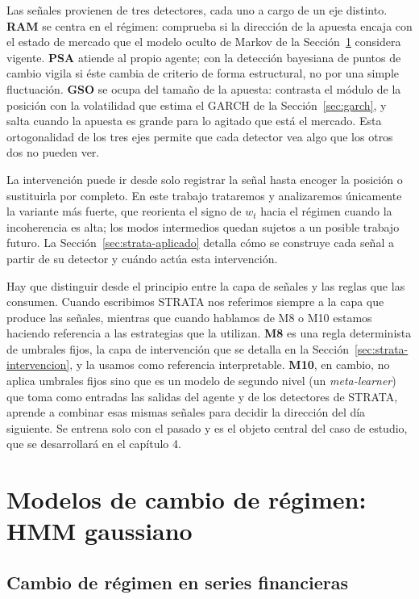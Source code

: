 Las señales provienen de tres detectores, cada uno a cargo de un eje distinto. \textbf{RAM} se centra en el régimen: comprueba si la dirección de la apuesta encaja con el estado de mercado que el modelo oculto de Markov de la Sección~\ref{sec:hmm} considera vigente. \textbf{PSA} atiende al propio agente; con la detección bayesiana de puntos de cambio vigila si éste cambia de criterio de forma estructural, no por una simple fluctuación. \textbf{GSO} se ocupa del tamaño de la apuesta: contrasta el módulo de la posición con la volatilidad que estima el GARCH de la Sección~\ref{sec:garch}, y salta cuando la apuesta es grande para lo agitado que está el mercado. Esta ortogonalidad de los tres ejes permite que cada detector vea algo que los otros dos no pueden ver.

La intervención puede ir desde solo registrar la señal hasta encoger la posición o sustituirla por completo. En este trabajo trataremos y analizaremos únicamente la variante más fuerte, que reorienta el signo de $w_t$ hacia el régimen cuando la incoherencia es alta; los modos intermedios quedan sujetos a un posible trabajo futuro. La Sección~\ref{sec:strata-aplicado} detalla cómo se construye cada señal a partir de su detector y cuándo actúa esta intervención.

Hay que distinguir desde el principio entre la capa de señales y las reglas que las consumen. Cuando escribimos STRATA nos referimos siempre a la capa que produce las señales, mientras que cuando hablamos de M8 o M10 estamos haciendo referencia a las estrategias que la utilizan. \textbf{M8} es una regla determinista de umbrales fijos, la capa de intervención que se detalla en la Sección~\ref{sec:strata-intervencion}, y la usamos como referencia interpretable. \textbf{M10}, en cambio, no aplica umbrales fijos sino que es un modelo de segundo nivel (un \emph{meta-learner}) que toma como entradas las salidas del agente y de los
detectores de STRATA, aprende a combinar esas mismas señales para decidir la dirección del
día siguiente. Se entrena solo con el pasado y es el
objeto central del caso de estudio, que se desarrollará en el capítulo 4.

\section{Modelos de cambio de régimen: HMM gaussiano}
\label{sec:hmm}

\subsection{Cambio de régimen en series financieras}
\label{sec:hmm-regimen}

